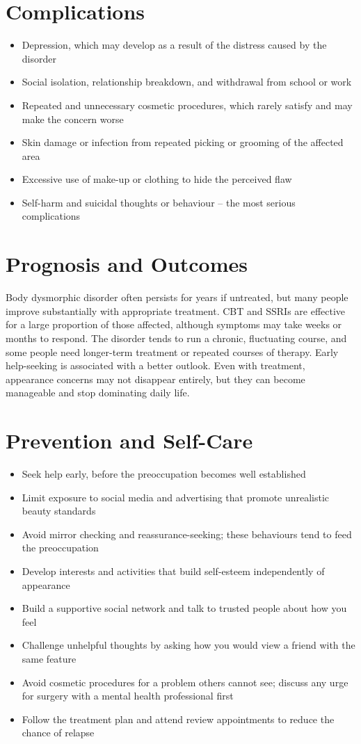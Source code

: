 \section*{Complications}
\begin{itemize}
    \item Depression, which may develop as a result of the distress caused by the disorder
    \item Social isolation, relationship breakdown, and withdrawal from school or work
    \item Repeated and unnecessary cosmetic procedures, which rarely satisfy and may make the concern worse
    \item Skin damage or infection from repeated picking or grooming of the affected area
    \item Excessive use of make-up or clothing to hide the perceived flaw
    \item Self-harm and suicidal thoughts or behaviour -- the most serious complications
\end{itemize}

\section*{Prognosis and Outcomes}
Body dysmorphic disorder often persists for years if untreated, but many people improve substantially with appropriate treatment. CBT and SSRIs are effective for a large proportion of those affected, although symptoms may take weeks or months to respond. The disorder tends to run a chronic, fluctuating course, and some people need longer-term treatment or repeated courses of therapy. Early help-seeking is associated with a better outlook. Even with treatment, appearance concerns may not disappear entirely, but they can become manageable and stop dominating daily life.

\section*{Prevention and Self-Care}
\begin{itemize}
    \item Seek help early, before the preoccupation becomes well established
    \item Limit exposure to social media and advertising that promote unrealistic beauty standards
    \item Avoid mirror checking and reassurance-seeking; these behaviours tend to feed the preoccupation
    \item Develop interests and activities that build self-esteem independently of appearance
    \item Build a supportive social network and talk to trusted people about how you feel
    \item Challenge unhelpful thoughts by asking how you would view a friend with the same feature
    \item Avoid cosmetic procedures for a problem others cannot see; discuss any urge for surgery with a mental health professional first
    \item Follow the treatment plan and attend review appointments to reduce the chance of relapse
\end{itemize}

